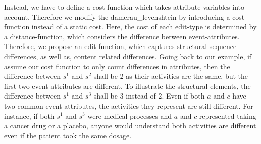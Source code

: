 \documentclass[./../../paper.tex]{subfiles}
\begin{document}
Instead, we have to define a cost function which takes attribute variables into account. Therefore we modify the \gls{damerau_levenshtein} by introducing a cost function instead of a static cost. Here, the cost of each edit-type is determined by a distance-function, which considers the difference between event-attributes. Therefore, we propose an edit-function, which captures structural sequence differences, as well as, content related differences. Going back to our example, if assume our cost function to only count differences in attributes, then the difference between $s^1$ and $s^2$ shall be 2 as their activities are the same, but the first two event attributes are different. To illustrate the structural elements, the difference between $s^1$ and $s^3$ shall be 3 instead of 2. Even if both $a$ and $c$ have two common event attributes, the activities they represent are still different. For instance, if both $s^1$ and $s^3$ were medical processes and $a$ and $c$ represented taking a cancer drug or a placebo, anyone would understand both activities are different even if the patient took the same dosage.

\end{document}
